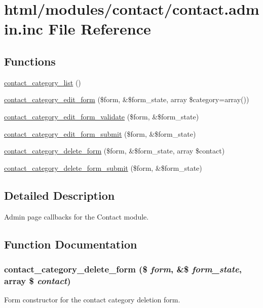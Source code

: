 \hypertarget{contact_8admin_8inc}{
\section{html/modules/contact/contact.admin.inc File Reference}
\label{contact_8admin_8inc}
}
\subsection*{Functions}
\begin{DoxyCompactItemize}
\item 
\hyperlink{contact_8admin_8inc_a4104e4a75baac7e93f42fec5fed43f64}{contact\_\-category\_\-list} ()
\item 
\hyperlink{group__forms_ga9283549b12df4a9a6cdb49202ae658ac}{contact\_\-category\_\-edit\_\-form} (\$form, \&\$form\_\-state, array \$category=array())
\item 
\hyperlink{contact_8admin_8inc_a6d89c84e8d85557599491e121adc0faa}{contact\_\-category\_\-edit\_\-form\_\-validate} (\$form, \&\$form\_\-state)
\item 
\hyperlink{contact_8admin_8inc_a3bd710e3ce90722af2a776e664a0f813}{contact\_\-category\_\-edit\_\-form\_\-submit} (\$form, \&\$form\_\-state)
\item 
\hyperlink{contact_8admin_8inc_a33918ea271cb307b297673f8ea1eaf58}{contact\_\-category\_\-delete\_\-form} (\$form, \&\$form\_\-state, array \$contact)
\item 
\hyperlink{contact_8admin_8inc_a970b9c33770826b0f0229ffc42c0e277}{contact\_\-category\_\-delete\_\-form\_\-submit} (\$form, \&\$form\_\-state)
\end{DoxyCompactItemize}


\subsection{Detailed Description}
Admin page callbacks for the Contact module. 

\subsection{Function Documentation}
\hypertarget{contact_8admin_8inc_a33918ea271cb307b297673f8ea1eaf58}{
\subsubsection[{contact\_\-category\_\-delete\_\-form}]{\setlength{\rightskip}{0pt plus 5cm}contact\_\-category\_\-delete\_\-form (\$ {\em form}, \/  \&\$ {\em form\_\-state}, \/  array \$ {\em contact})}}
\label{contact_8admin_8inc_a33918ea271cb307b297673f8ea1eaf58}
Form constructor for the contact category deletion form.


